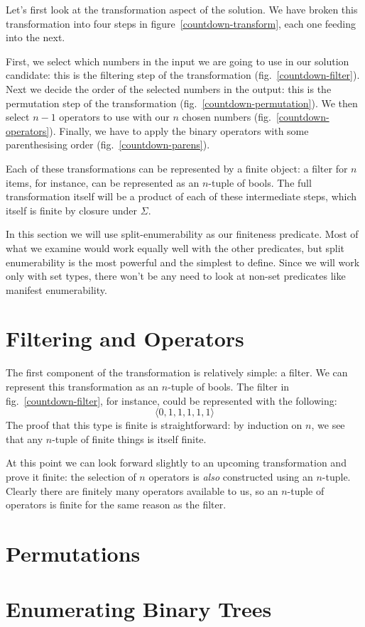 Let's first look at the transformation aspect of the solution.
We have broken this transformation into four steps in
figure~\ref{countdown-transform}, each one feeding into the next.

First, we select which numbers in the input we are going to use in our solution
candidate: this is the filtering step of the transformation
(fig.~\ref{countdown-filter}).
Next we decide the order of the selected numbers in the output: this is the
permutation step of the transformation (fig.~\ref{countdown-permutation}).
We then select \(n-1\) operators to use with our \(n\) chosen numbers
(fig.~\ref{countdown-operators}).
Finally, we have to apply the binary operators with some parenthesising order
(fig.~\ref{countdown-parens}).

Each of these transformations can be represented by a finite object: a filter
for \(n\) items, for instance, can be represented as an \(n\)-tuple of bools.
The full transformation itself will be a product of each of these intermediate
steps, which itself is finite by closure under \(\Sigma\).

In this section we will use split-enumerability as our finiteness predicate.
Most of what we examine would work equally well with the other predicates, but
split enumerability is the most powerful and the simplest to define.
Since we will work only with set types, there won't be any need to look at
non-set predicates like manifest enumerability.
\section{Filtering and Operators}
The first component of the transformation is relatively simple: a filter.
We can represent this transformation as an \(n\)-tuple of bools.
The filter in fig.~\ref{countdown-filter}, for instance, could be represented
with the following:
\begin{equation}
  \langle 0 , 1 , 1 , 1 , 1 , 1  \rangle
\end{equation}
The proof that this type is finite is straightforward: by induction on \(n\), we
see that any \(n\)-tuple of finite things is itself finite.

At this point we can look forward slightly to an upcoming transformation and
prove it finite: the selection of \(n\) operators is \emph{also} constructed
using an \(n\)-tuple.
Clearly there are finitely many operators available to us, so an \(n\)-tuple of
operators is finite for the same reason as the filter.
\section{Permutations}
\section{Enumerating Binary Trees}


